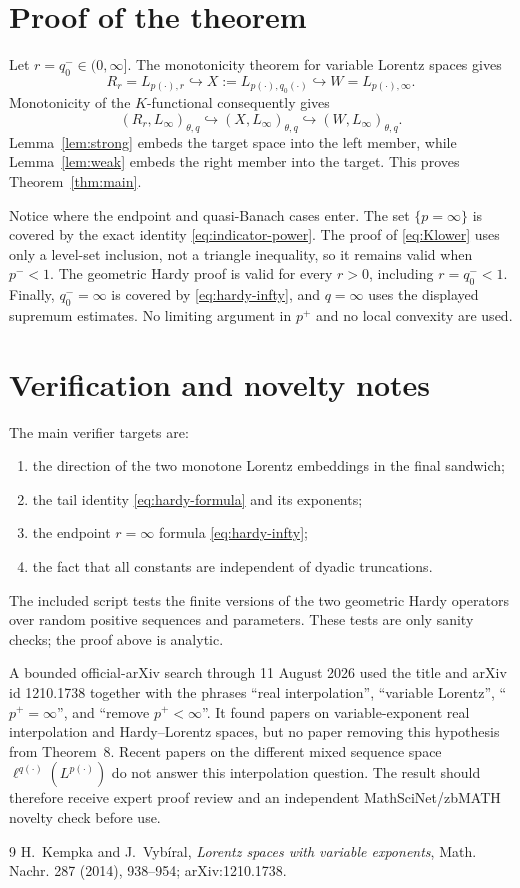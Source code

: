 \documentclass[11pt]{article}
\newcommand{\1}{\mathbf 1}
\begin{document}
\section{Proof of the theorem}

Let $r=q_0^-\in(0,\infty]$.  The monotonicity theorem for variable Lorentz
spaces \cite[Theorem~7(i)]{KV} gives
\[
 R_r=L_{p(\cdot),r}\hookrightarrow
 X:=L_{p(\cdot),q_0(\cdot)}\hookrightarrow
 W=L_{p(\cdot),\infty}.
\]
Monotonicity of the $K$-functional consequently gives
\[
 (R_r,L_\infty)_{\theta,q}\hookrightarrow
 (X,L_\infty)_{\theta,q}\hookrightarrow
 (W,L_\infty)_{\theta,q}.
\]
Lemma~\ref{lem:strong} embeds the target space into the left member, while
Lemma~\ref{lem:weak} embeds the right member into the target. This proves
Theorem~\ref{thm:main}.

Notice where the endpoint and quasi-Banach cases enter.  The set
$\{p=\infty\}$ is covered by the exact identity
\eqref{eq:indicator-power}.  The proof of \eqref{eq:Klower} uses only a
level-set inclusion, not a triangle inequality, so it remains valid when
$p^-<1$.  The geometric Hardy proof is valid for every $r>0$, including
$r=q_0^-<1$.  Finally, $q_0^-=\infty$ is covered by
\eqref{eq:hardy-infty}, and $q=\infty$ uses the displayed supremum estimates.
No limiting argument in $p^+$ and no local convexity are used.

\section{Verification and novelty notes}

The main verifier targets are:
\begin{enumerate}
\item the direction of the two monotone Lorentz embeddings in the final
sandwich;
\item the tail identity \eqref{eq:hardy-formula} and its exponents;
\item the endpoint $r=\infty$ formula \eqref{eq:hardy-infty};
\item the fact that all constants are independent of dyadic truncations.
\end{enumerate}
The included script tests the finite versions of the two geometric Hardy
operators over random positive sequences and parameters. These tests are only
sanity checks; the proof above is analytic.

A bounded official-arXiv search through 11 August 2026 used the title and
arXiv id 1210.1738 together with the phrases ``real interpolation'',
``variable Lorentz'', ``$p^+=\infty$'', and ``remove $p^+<\infty$''.  It found
papers on variable-exponent real interpolation and Hardy--Lorentz spaces, but
no paper removing this hypothesis from Theorem~8.  Recent papers on the
different mixed sequence space $\ell^{q(\cdot)}(L^{p(\cdot)})$ do not answer
this interpolation question.  The result should therefore receive expert
proof review and an independent MathSciNet/zbMATH novelty check before use.

\begin{thebibliography}{9}
H.~Kempka and J.~Vyb\'iral,
\emph{Lorentz spaces with variable exponents},
Math. Nachr. 287 (2014), 938--954; arXiv:1210.1738.
\end{thebibliography}
\end{document}

